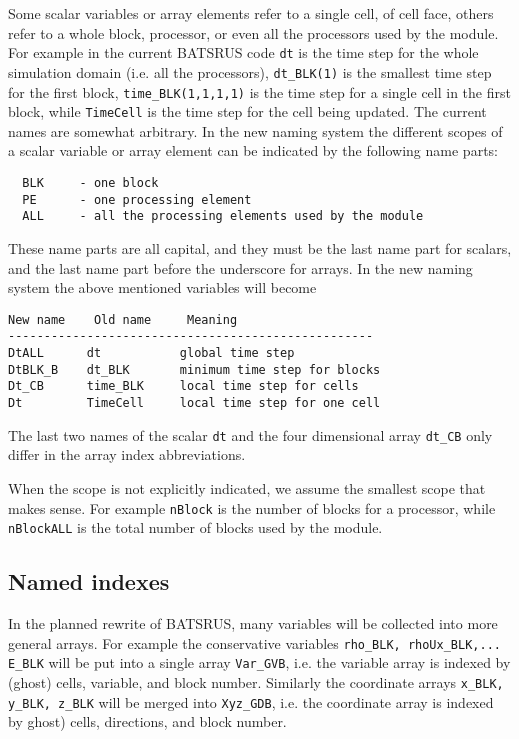 Some scalar variables or array elements refer to a single cell, 
of cell face, others refer to a whole block, processor, or even
all the processors used by the module. For example in the current
BATSRUS code {\tt dt} is the time step for the whole simulation
domain (i.e. all the processors), {\tt dt\_BLK(1)} is the smallest time step 
for the first block, {\tt time\_BLK(1,1,1,1)} is the time step for
a single cell in the first block, while {\tt TimeCell} is the time
step for the cell being updated. The current names are 
somewhat arbitrary. In the new naming system the different
scopes of a scalar variable or array element can be indicated by the 
following name parts:
\begin{verbatim}
  BLK     - one block
  PE      - one processing element
  ALL     - all the processing elements used by the module
\end{verbatim}
These name parts are all capital, and they must be the last name part
for scalars, and the last name part before the underscore for arrays.
In the new naming system the above mentioned variables will become
\begin{verbatim}
New name    Old name     Meaning
---------------------------------------------------
DtALL      dt           global time step
DtBLK_B    dt_BLK       minimum time step for blocks
Dt_CB      time_BLK     local time step for cells
Dt         TimeCell     local time step for one cell
\end{verbatim}
The last two names of the scalar {\tt dt} and the four dimensional 
array {\tt dt\_CB} only differ in the array index abbreviations.

When the scope is not explicitly indicated, we assume the 
smallest scope that makes sense. For example {\tt nBlock}
is the number of blocks for a processor, while {\tt nBlockALL}
is the total number of blocks used by the module.

\subsection{Named indexes}

In the planned rewrite of BATSRUS, many variables will be collected into
more general arrays. For example the conservative variables  
{\tt rho\_BLK, rhoUx\_BLK,... E\_BLK} will be put into a single array
{\tt Var\_GVB}, i.e. the variable array is indexed by (ghost) cells, 
variable, and block number. Similarly the coordinate arrays 
{\tt x\_BLK, y\_BLK, z\_BLK} will be merged into {\tt Xyz\_GDB},
i.e. the coordinate array is indexed by ghost) cells,
directions, and block number. 

